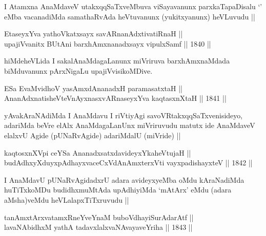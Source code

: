 \begin{artha}
I Atamxna AnaMdaveV utakxqqSaTxveMbuva viSayavanunx parxkaTapaDisalu
`\stext' eMba vacanadiMda samathaRvAda heVtuvanunx (yukitxyanunx)
heVLuvudu ||
\end{artha}

\begin{shl}
EtaseyxYva yathoVkatxsayx savARnanAdxtivatiRnaH || \\
upajiVvanitx BUtAni barxhAmxnanadxsayx vipulxSamf ||  1840 ||  
\end{shl}

\begin{artha}
hiMdeheVLida I sakalAnaMdagaLanunx miVriruva barxhAmxnaMdada
biMduvanunx pArxNigaLu upajiVvisikoMDive.
\end{artha}

\begin{shl}
ESa EvaMvidhoV yasAmxdAnanadxH paramasatxtaH || \\
AnanAdxnatisheVteV\s nAyxnasxvARnaseyxYva kaqtasxnXtaH ||  1841 ||  
\end{shl}

\begin{artha}
yAvakAraNAdiMda I AnaMdavu I riVtiyAgi savoVRtakxqqSaTxvenisideyo,
adariMda beVre elAlx AnaMdagaLanUnx miVriruvudu matutx ide AnaMdaveV
elalxvU Agide (pUNaRvAgide) adariMdalU (miVride) ||
\end{artha}


\begin{shl}
kaqtosxnXV\s pi ceYSa AnanadxsatxdavideyxYkaheVtujaH || \\
budAdhxyXduyxpAdhayxvaceCxVdAnAmxterxVti vayxpadishayxteV ||  1842 ||  
\end{shl}

\begin{artha}
I AnaMdavU pUNaRvAgidadxrU adara avideyxyeMba oMdu kAraNadiMda
huTiTxkoMDu budidhxmuMtAda upAdhiyiMda `mAtArx' eMdu (adara
aMsha)veMdu heVLalapxTiTxruvudu ||
\end{artha}


\begin{shl}
tanAmxtArxvatamxRneYveYnaM buboVdhayiSurAdarAtf || \\
lavaNAbidhxM yathA tadavxlalxvaNAvayaveYriha ||  1843 ||  
\end{shl}
				
